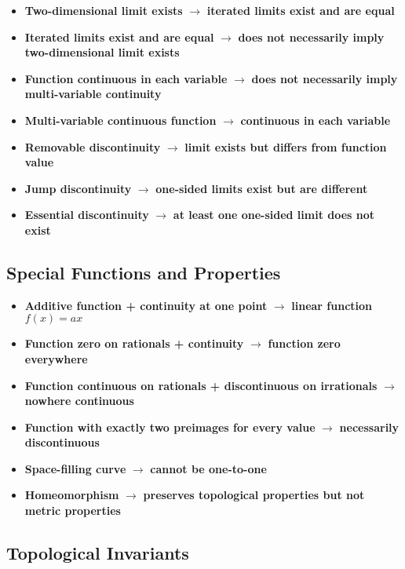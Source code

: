 \begin{itemize}
\item \textbf{Two-dimensional limit exists} $\rightarrow$ \textbf{iterated limits exist and are equal}
\item \textbf{Iterated limits exist and are equal} $\rightarrow$ \textbf{does not necessarily imply two-dimensional limit exists}
\item \textbf{Function continuous in each variable} $\rightarrow$ \textbf{does not necessarily imply multi-variable continuity}
\item \textbf{Multi-variable continuous function} $\rightarrow$ \textbf{continuous in each variable}
\item \textbf{Removable discontinuity} $\rightarrow$ \textbf{limit exists but differs from function value}
\item \textbf{Jump discontinuity} $\rightarrow$ \textbf{one-sided limits exist but are different}
\item \textbf{Essential discontinuity} $\rightarrow$ \textbf{at least one one-sided limit does not exist}
\end{itemize}

\subsection*{Special Functions and Properties}

\begin{itemize}
\item \textbf{Additive function + continuity at one point} $\rightarrow$ \textbf{linear function $f(x) = ax$}
\item \textbf{Function zero on rationals + continuity} $\rightarrow$ \textbf{function zero everywhere}
\item \textbf{Function continuous on rationals + discontinuous on irrationals} $\rightarrow$ \textbf{nowhere continuous}
\item \textbf{Function with exactly two preimages for every value} $\rightarrow$ \textbf{necessarily discontinuous}
\item \textbf{Space-filling curve} $\rightarrow$ \textbf{cannot be one-to-one}
\item \textbf{Homeomorphism} $\rightarrow$ \textbf{preserves topological properties but not metric properties}
\end{itemize}

\subsection*{Topological Invariants}

